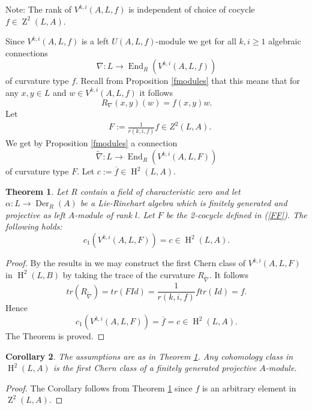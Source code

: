 \documentclass{amsart}
\theoremstyle{plain}
\newtheorem{theorem}{Theorem}[section]
\newtheorem{corollary}[theorem]{Corollary}
\theoremstyle{definition}
\theoremstyle{remark}
\numberwithin{equation}{theorem}
\begin{document}
Note: The rank of $V^{k,i}({A},L,f)$ is independent of choice of cocycle $f\in {\operatorname{Z}}^2(L,{A})$.

Since $V^{k,i}({A},L,f)$ is a left $U({A},L,f)$-module we get for all $k,i\geq 1$ algebraic connections
\[ \nabla: L\rightarrow {\operatorname{End} }_{R}(V^{k,i}({A},L,f)) \]
of curvature type $f$. Recall from Proposition \ref{fmodules} 
that this means that for any $x,y\in L$ and $w\in V^{k,i}({A},L,f)$ it follows
\[ R_\nabla(x,y)(w)=f(x,y)w.\]
Let 
\begin{align}
&\label{FF} F:=\frac{1}{r(k,i,f)}f\in Z^2(L,{A}). 
\end{align}
We get by Proposition \ref{fmodules} a connection
\[ \tilde{\nabla}:L\rightarrow {\operatorname{End} }_{R}(V^{k,i}({A},L, F))\]
of curvature type $F$. Let $c:=\overline{f}\in {\operatorname{H} }^2(L,{A})$.

\begin{theorem} \label{main}Let ${R}$ contain a field of characteristic zero and let $\alpha:L\rightarrow {\operatorname{Der} }_R(A)$ 
be a Lie-Rinehart algebra which is finitely generated and projective as left ${A}$-module of rank $l$. 
Let $F$ be the 2-cocycle defined in (\ref{FF}).
The following holds: 
\[ c_1(V^{k,i}({A},L,F))= c \in {\operatorname{H} }^2(L,{A}).\]
\end{theorem}
\begin{proof} By the results in \cite{maa1} we may construct the first Chern class of $V^{k,i}({A},L, F)$
in ${\operatorname{H} }^2(L,B)$ by taking the trace of the curvature $R_{\tilde{\nabla}}$. It follows
\[ tr(R_{\tilde{\nabla}})=tr(F Id)=\frac{1}{r(k,i,f)}f tr(Id)=f.\]
Hence
\[c_1(V^{k,i}({A},L,F))=\overline{f}=c \in {\operatorname{H} }^2(L,{A}).\]
The Theorem is proved.
\end{proof}

\begin{corollary} \label{chernclass} The assumptions are as in Theorem \ref{main}.
Any cohomology class in ${\operatorname{H} }^2(L,{A})$ is the first Chern class 
of a finitely generated projective ${A}$-module.
\end{corollary}
\begin{proof} The Corollary follows from Theorem \ref{main} since $f$ is an arbitrary element in ${\operatorname{Z}}^2(L,{A})$.
\end{proof}
\end{document}
